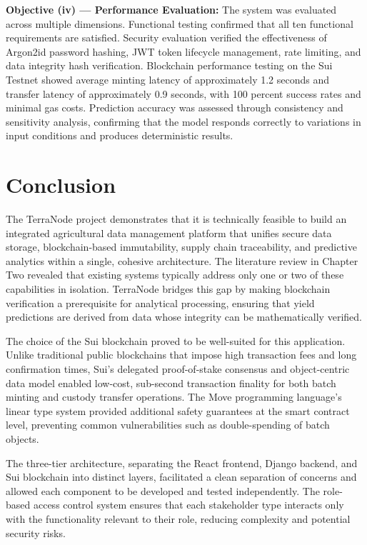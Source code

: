 \textbf{Objective (iv) --- Performance Evaluation:} The system was evaluated across multiple dimensions. Functional testing confirmed that all ten functional requirements are satisfied. Security evaluation verified the effectiveness of Argon2id password hashing, JWT token lifecycle management, rate limiting, and data integrity hash verification. Blockchain performance testing on the Sui Testnet showed average minting latency of approximately 1.2 seconds and transfer latency of approximately 0.9 seconds, with 100 percent success rates and minimal gas costs. Prediction accuracy was assessed through consistency and sensitivity analysis, confirming that the model responds correctly to variations in input conditions and produces deterministic results.

\section{Conclusion}

The TerraNode project demonstrates that it is technically feasible to build an integrated agricultural data management platform that unifies secure data storage, blockchain-based immutability, supply chain traceability, and predictive analytics within a single, cohesive architecture. The literature review in Chapter Two revealed that existing systems typically address only one or two of these capabilities in isolation. TerraNode bridges this gap by making blockchain verification a prerequisite for analytical processing, ensuring that yield predictions are derived from data whose integrity can be mathematically verified.

The choice of the Sui blockchain proved to be well-suited for this application. Unlike traditional public blockchains that impose high transaction fees and long confirmation times, Sui's delegated proof-of-stake consensus and object-centric data model enabled low-cost, sub-second transaction finality for both batch minting and custody transfer operations. The Move programming language's linear type system provided additional safety guarantees at the smart contract level, preventing common vulnerabilities such as double-spending of batch objects.

The three-tier architecture, separating the React frontend, Django backend, and Sui blockchain into distinct layers, facilitated a clean separation of concerns and allowed each component to be developed and tested independently. The role-based access control system ensures that each stakeholder type interacts only with the functionality relevant to their role, reducing complexity and potential security risks.

